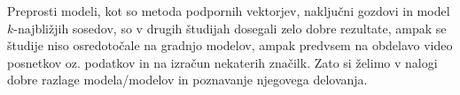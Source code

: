 \documentclass[a4paper,12pt]{article}
\begin{document}
Preprosti modeli, kot so metoda podpornih vektorjev, naključni gozdovi in model $k$-najbližjih sosedov, so 
v drugih študijah dosegali zelo dobre rezultate, ampak se študije niso osredotočale na gradnjo 
modelov, ampak predvsem na obdelavo video posnetkov oz. podatkov in na izračun nekaterih značilk. Zato si 
želimo v nalogi dobre razlage modela/modelov in poznavanje njegovega delovanja.

\newpage
\printbibliography
\end{document}
